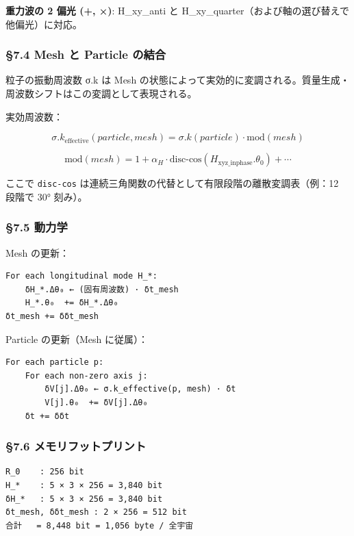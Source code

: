 \documentclass[a4paper,11pt]{ltjsarticle}
\begin{document}
\textbf{重力波の 2 偏光 (+, ×)}: H\_xy\_anti と
H\_xy\_quarter（および軸の選び替えで他偏光）に対応。

\subsubsection{§7.4 Mesh と Particle
の結合}\label{mesh-ux3068-particle-ux306eux7d50ux5408}

粒子の振動周波数 σ.k は Mesh
の状態によって実効的に変調される。質量生成・周波数シフトはこの変調として表現される。

実効周波数：

\[\sigma.k_{\text{effective}}(particle, mesh) = \sigma.k(particle) \cdot \text{mod}(mesh)\]

\[\text{mod}(mesh) = 1 + \alpha_H \cdot \text{disc-cos}(H_{\text{xyz\_inphase}}.\theta_0) + \cdots\]

ここで \texttt{disc-cos}
は連続三角関数の代替として有限段階の離散変調表（例：12 段階で 30°
刻み）。

\subsubsection{§7.5 動力学}\label{ux52d5ux529bux5b66}

Mesh の更新：

\begin{verbatim}
For each longitudinal mode H_*:
    δH_*.Δθ₀ ← (固有周波数) · δt_mesh
    H_*.θ₀  += δH_*.Δθ₀
δt_mesh += δδt_mesh
\end{verbatim}

Particle の更新（Mesh に従属）：

\begin{verbatim}
For each particle p:
    For each non-zero axis j:
        δV[j].Δθ₀ ← σ.k_effective(p, mesh) · δt
        V[j].θ₀  += δV[j].Δθ₀
    δt += δδt
\end{verbatim}

\subsubsection{§7.6
メモリフットプリント}\label{ux30e1ux30e2ux30eaux30d5ux30c3ux30c8ux30d7ux30eaux30f3ux30c8-1}

\begin{verbatim}
R_0    : 256 bit
H_*    : 5 × 3 × 256 = 3,840 bit
δH_*   : 5 × 3 × 256 = 3,840 bit
δt_mesh, δδt_mesh : 2 × 256 = 512 bit
合計   = 8,448 bit = 1,056 byte / 全宇宙
\end{verbatim}
\end{document}
